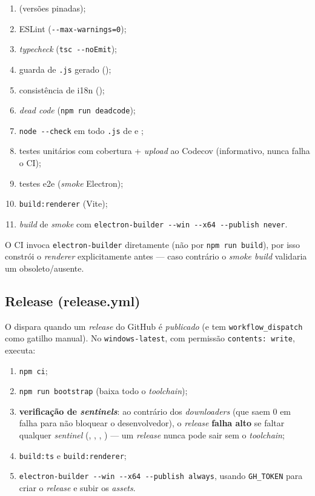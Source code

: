 \begin{enumerate}[nosep]
  \item {} (versões pinadas);
  \item ESLint (\lstinline|--max-warnings=0|);
  \item \emph{typecheck} (\lstinline|tsc --noEmit|);
  \item guarda de \texttt{.js} gerado ();
  \item consistência de i18n ();
  \item \emph{dead code} (\lstinline|npm run deadcode|);
  \item \lstinline|node --check| em todo \texttt{.js} de  e ;
  \item testes unitários com cobertura + \emph{upload} ao Codecov
        (informativo, nunca falha o CI);
  \item testes e2e (\emph{smoke} Electron);
  \item \texttt{build:renderer} (Vite);
  \item \emph{build} de \emph{smoke} com
        \lstinline|electron-builder --win --x64 --publish never|.
\end{enumerate}

\noindent
O CI invoca \lstinline|electron-builder| diretamente (não por \texttt{npm run
build}), por isso constrói o \emph{renderer} explicitamente antes --- caso
contrário o \emph{smoke build} validaria um  obsoleto/ausente.

\subsection{Release (release.yml)}

O  dispara quando um \emph{release} do GitHub
é \emph{publicado} (e tem \texttt{workflow\_dispatch} como gatilho manual). No
\texttt{windows-latest}, com permissão \lstinline|contents: write|, executa:

\begin{enumerate}[nosep]
  \item \lstinline|npm ci|;
  \item \lstinline|npm run bootstrap| (baixa todo o \emph{toolchain});
  \item \textbf{verificação de \emph{sentinels}}: ao contrário dos
        \emph{downloaders} (que saem 0 em falha para não bloquear o
        desenvolvedor), o \emph{release} \textbf{falha alto} se faltar qualquer
        \emph{sentinel}
        (, ,
        , ) --- um \emph{release}
        nunca pode sair sem o \emph{toolchain};
  \item \texttt{build:ts} e \texttt{build:renderer};
  \item \lstinline|electron-builder --win --x64 --publish always|, usando
        \texttt{GH\_TOKEN} para criar o \emph{release} e subir os \emph{assets}.
\end{enumerate}

